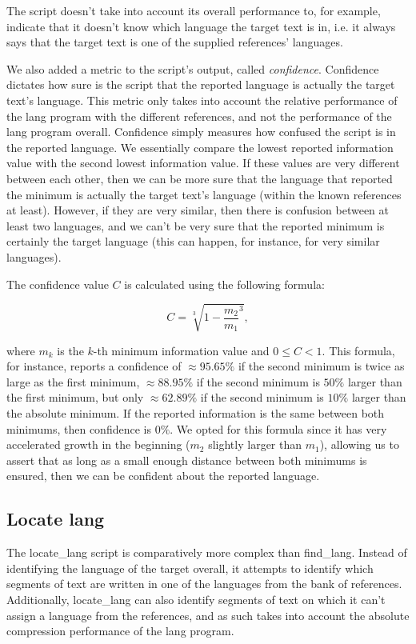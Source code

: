 \documentclass{article}
\begin{document}
The script doesn't take into account its overall performance to, for example, indicate that it doesn't know which language the target text is in, i.e. it always says that the target text is one of the supplied references' languages.

We also added a metric to the script's output, called \textit{confidence}.
Confidence dictates how sure is the script that the reported language is actually the target text's language.
This metric only takes into account the relative performance of the lang program with the different references, and not the performance of the lang program overall.
Confidence simply measures how confused the script is in the reported language.
We essentially compare the lowest reported information value with the second lowest information value.
If these values are very different between each other, then we can be more sure that the language that reported the minimum is actually the target text's language (within the known references at least).
However, if they are very similar, then there is confusion between at least two languages, and we can't be very sure that the reported minimum is certainly the target language (this can happen, for instance, for very similar languages).

The confidence value $C$ is calculated using the following formula:

$$
C = \sqrt[3]{1 - \frac{m_2}{m_1}^3},
$$

where $m_k$ is the $k$-th minimum information value and $0 \leq C < 1$.
This formula, for instance, reports a confidence of $\approx 95.65\%$ if the second minimum is twice as large as the first minimum, $\approx 88.95\%$ if the second minimum is $50\%$ larger than the first minimum, but only $\approx 62.89\%$ if the second minimum is $10\%$ larger than the absolute minimum.
If the reported information is the same between both minimums, then confidence is $0\%$.
We opted for this formula since it has very accelerated growth in the beginning ($m_2$ slightly larger than $m_1$), allowing us to assert that as long as a small enough distance between both minimums is ensured, then we can be confident about the reported language.

\subsection{Locate lang}
\label{subsec:methodology_locate_lang}

The locate_lang script is comparatively more complex than find_lang.
Instead of identifying the language of the target overall, it attempts to identify which segments of text are written in one of the languages from the bank of references.
Additionally, locate_lang can also identify segments of text on which it can't assign a language from the references, and as such takes into account the absolute compression performance of the lang program.
\end{document}

